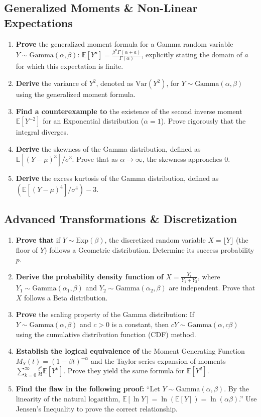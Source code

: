 \documentclass[11pt, a4paper]{article}
\theoremstyle{definition}
\theoremstyle{remark}
\newcommand{\E}{\mathbb{E}}
\begin{document}
\subsection{Generalized Moments \& Non-Linear Expectations}
\begin{enumerate}[label=\textbf{\arabic*.}, resume]
    \item \textbf{Prove} the generalized moment formula for a Gamma random variable $Y \sim \text{Gamma}(\alpha, \beta)$: $\E[Y^a] = \frac{\beta^a \Gamma(\alpha + a)}{\Gamma(\alpha)}$, explicitly stating the domain of $a$ for which this expectation is finite.
    \item \textbf{Derive} the variance of $Y^2$, denoted as $\text{Var}(Y^2)$, for $Y \sim \text{Gamma}(\alpha, \beta)$ using the generalized moment formula.
    \item \textbf{Find a counterexample to} the existence of the second inverse moment $\E[Y^{-2}]$ for an Exponential distribution ($\alpha = 1$). Prove rigorously that the integral diverges.
    \item \textbf{Derive} the skewness of the Gamma distribution, defined as $\E[(Y - \mu)^3] / \sigma^3$. Prove that as $\alpha \to \infty$, the skewness approaches $0$.
    \item \textbf{Derive} the excess kurtosis of the Gamma distribution, defined as $(\E[(Y - \mu)^4] / \sigma^4) - 3$.
\end{enumerate}

\subsection{Advanced Transformations \& Discretization}
\begin{enumerate}[label=\textbf{\arabic*.}, resume]
    \item \textbf{Prove that} if $Y \sim \text{Exp}(\beta)$, the discretized random variable $X = \lfloor Y \rfloor$ (the floor of $Y$) follows a Geometric distribution. Determine its success probability $p$.
    \item \textbf{Derive the probability density function of} $X = \frac{Y_1}{Y_1 + Y_2}$, where $Y_1 \sim \text{Gamma}(\alpha_1, \beta)$ and $Y_2 \sim \text{Gamma}(\alpha_2, \beta)$ are independent. Prove that $X$ follows a Beta distribution.
    \item \textbf{Prove} the scaling property of the Gamma distribution: If $Y \sim \text{Gamma}(\alpha, \beta)$ and $c > 0$ is a constant, then $cY \sim \text{Gamma}(\alpha, c\beta)$ using the cumulative distribution function (CDF) method.
    \item \textbf{Establish the logical equivalence of} the Moment Generating Function $M_Y(t) = (1 - \beta t)^{-\alpha}$ and the Taylor series expansion of moments $\sum_{k=0}^{\infty} \frac{t^k}{k!} \E[Y^k]$. Prove they yield the same formula for $\E[Y^2]$.
    \item \textbf{Find the flaw in the following proof:} ``Let $Y \sim \text{Gamma}(\alpha, \beta)$. By the linearity of the natural logarithm, $\E[\ln Y] = \ln(\E[Y]) = \ln(\alpha\beta)$.'' Use Jensen's Inequality to prove the correct relationship.
\end{enumerate}
\end{document}
